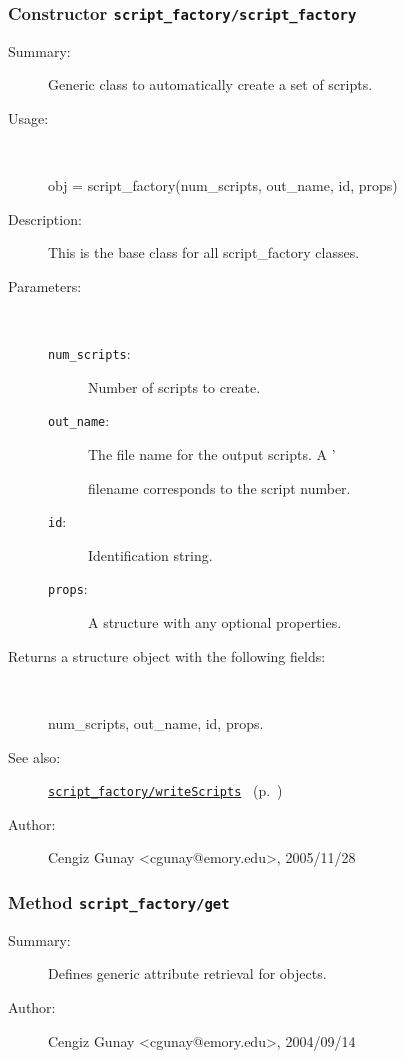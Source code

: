 \subsubsection[Constructor \texttt{script\_factory}]{Constructor \texttt{script\_factory/script\_factory}}%
%
\label{ref_script_factory__script_factory}%
\hypertarget{ref_script_factory__script_factory}{}%
\begin{description}
\item[Summary:]Generic class to automatically create a set of scripts.
%
\item[Usage:]~%
\begin{lyxcode}%
obj = script\_factory(num\_scripts, out\_name, id, props)
%
\end{lyxcode}%
%
\item[Description:]%
This is the base class for all script\_factory classes.
\item[Parameters:]~
\begin{description}%
\item[\texttt{num\_scripts}:]
 Number of scripts to create.
\item[\texttt{out\_name}:]
 The file name for the output scripts. A '%

filename corresponds to the script number.\item[\texttt{id}:]
 Identification string.
\item[\texttt{props}:]
 A structure with any optional properties.
\end{description}%
%
\item[Returns a structure object with the following fields:]~

	num\_scripts, out\_name, id, props.
%
%
\item[See also:]%
\hyperlink{ref_script_factory__writeScripts}{\texttt{script\_factory/writeScripts}}%
\ (p.~\pageref{ref_script_factory__writeScripts})%
%
%
\item[Author:]%
Cengiz Gunay <cgunay@emory.edu>, 2005/11/28%
\end{description}
\methodline%
\subsubsection[Method \texttt{get}]{Method \texttt{script\_factory/get}}%
%
\label{ref_script_factory__get}%
\hypertarget{ref_script_factory__get}{}%
\begin{description}
\item[Summary:]Defines generic attribute retrieval for objects.
%
%
%
%
%
%
%
\item[Author:]%
Cengiz Gunay <cgunay@emory.edu>, 2004/09/14%
\end{description}
\methodline%
